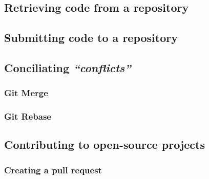 \documentclass[
]{book}
\begin{document}
\hypertarget{retrieving-code-from-a-repository}{%
\subsection{Retrieving code from a repository}\label{retrieving-code-from-a-repository}}

\hypertarget{submitting-code-to-a-repository}{%
\subsection{Submitting code to a repository}\label{submitting-code-to-a-repository}}

\hypertarget{conciliating-conflicts}{%
\subsection{\texorpdfstring{Conciliating \emph{``conflicts''}}{Conciliating ``conflicts''}}\label{conciliating-conflicts}}

\hypertarget{git-merge}{%
\subsubsection{Git Merge}\label{git-merge}}

\hypertarget{git-rebase}{%
\subsubsection{Git Rebase}\label{git-rebase}}

\hypertarget{contributing-to-open-source-projects}{%
\subsection{Contributing to open-source projects}\label{contributing-to-open-source-projects}}

\hypertarget{creating-a-pull-request}{%
\subsubsection{Creating a pull request}\label{creating-a-pull-request}}

  
\end{document}
